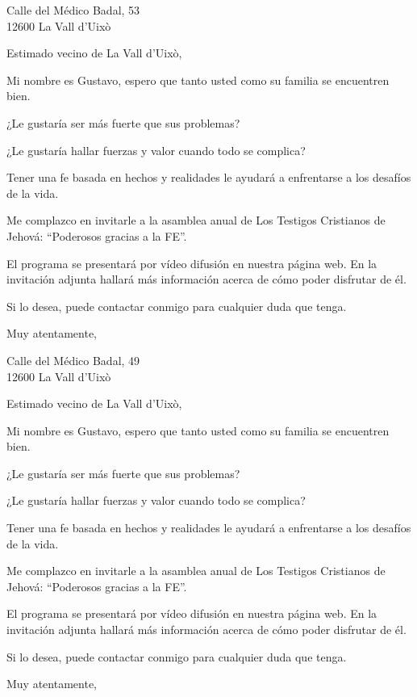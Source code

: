 \documentclass{scrlttr2}
\begin{document}
\begin{letter}{%
Calle del Médico Badal, 53\\
12600 La Vall d'Uixò\\
}
\opening{Estimado vecino de La Vall d'Uixò,}

Mi nombre es Gustavo, espero que tanto usted como su familia se encuentren bien.

¿Le gustaría ser más fuerte que sus problemas?

¿Le gustaría hallar fuerzas y valor cuando todo se complica?

Tener una fe basada en hechos y realidades le ayudará a enfrentarse a los desafíos de la vida.

Me complazco en invitarle a la asamblea anual de Los Testigos Cristianos de Jehová: ``Poderosos gracias a la FE''.

El programa se presentará por vídeo difusión en nuestra página web. En la invitación adjunta hallará más información acerca de cómo poder disfrutar de él.

Si lo desea, puede contactar conmigo para cualquier duda que tenga.

\closing{Muy atentamente,}


\end{letter}
\begin{letter}{%
Calle del Médico Badal, 49\\
12600 La Vall d'Uixò\\
}
\opening{Estimado vecino de La Vall d'Uixò,}

Mi nombre es Gustavo, espero que tanto usted como su familia se encuentren bien.

¿Le gustaría ser más fuerte que sus problemas?

¿Le gustaría hallar fuerzas y valor cuando todo se complica?

Tener una fe basada en hechos y realidades le ayudará a enfrentarse a los desafíos de la vida.

Me complazco en invitarle a la asamblea anual de Los Testigos Cristianos de Jehová: ``Poderosos gracias a la FE''.

El programa se presentará por vídeo difusión en nuestra página web. En la invitación adjunta hallará más información acerca de cómo poder disfrutar de él.

Si lo desea, puede contactar conmigo para cualquier duda que tenga.

\closing{Muy atentamente,}


\end{letter}
\end{document}
